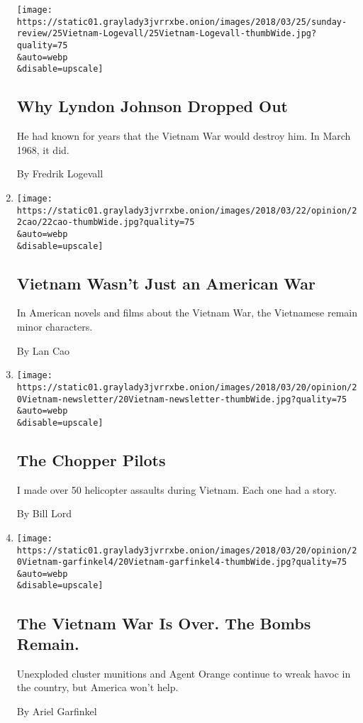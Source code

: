 \begin{enumerate}
  \texttt{[image: https://static01.graylady3jvrrxbe.onion/images/2018/03/25/sunday-review/25Vietnam-Logevall/25Vietnam-Logevall-thumbWide.jpg?quality=75\\\&auto=webp\\\&disable=upscale]}

  \hypertarget{why-lyndon-johnson-dropped-out}{%
  \subsection{Why Lyndon Johnson Dropped
  Out}\label{why-lyndon-johnson-dropped-out}}

  He had known for years that the Vietnam War would destroy him. In
  March 1968, it did.

  By Fredrik Logevall
\item
  \href{/2018/03/22/opinion/vietnam-wasnt-just-an-american-war.html}{}

  \texttt{[image: https://static01.graylady3jvrrxbe.onion/images/2018/03/22/opinion/22cao/22cao-thumbWide.jpg?quality=75\\\&auto=webp\\\&disable=upscale]}

  \hypertarget{vietnam-wasnt-just-an-american-war}{%
  \subsection{Vietnam Wasn't Just an American
  War}\label{vietnam-wasnt-just-an-american-war}}

  In American novels and films about the Vietnam War, the Vietnamese
  remain minor characters.

  By Lan Cao
\item
  \href{/2018/03/20/opinion/the-chopper-pilots.html}{}

  \texttt{[image: https://static01.graylady3jvrrxbe.onion/images/2018/03/20/opinion/20Vietnam-newsletter/20Vietnam-newsletter-thumbWide.jpg?quality=75\\\&auto=webp\\\&disable=upscale]}

  \hypertarget{the-chopper-pilots}{%
  \subsection{The Chopper Pilots}\label{the-chopper-pilots}}

  I made over 50 helicopter assaults during Vietnam. Each one had a
  story.

  By Bill Lord
\item
  \href{/2018/03/20/opinion/vietnam-war-agent-orange-bombs.html}{}

  \texttt{[image: https://static01.graylady3jvrrxbe.onion/images/2018/03/20/opinion/20Vietnam-garfinkel4/20Vietnam-garfinkel4-thumbWide.jpg?quality=75\\\&auto=webp\\\&disable=upscale]}

  \hypertarget{the-vietnam-war-is-over-the-bombs-remain}{%
  \subsection{The Vietnam War Is Over. The Bombs
  Remain.}\label{the-vietnam-war-is-over-the-bombs-remain}}

  Unexploded cluster munitions and Agent Orange continue to wreak havoc
  in the country, but America won't help.

  By Ariel Garfinkel
\end{enumerate}

